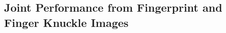 \subsection{Joint Performance from Fingerprint and Finger Knuckle Images\label{joint-performance}}

\begin{figure}
    \centering


\end{figure}
